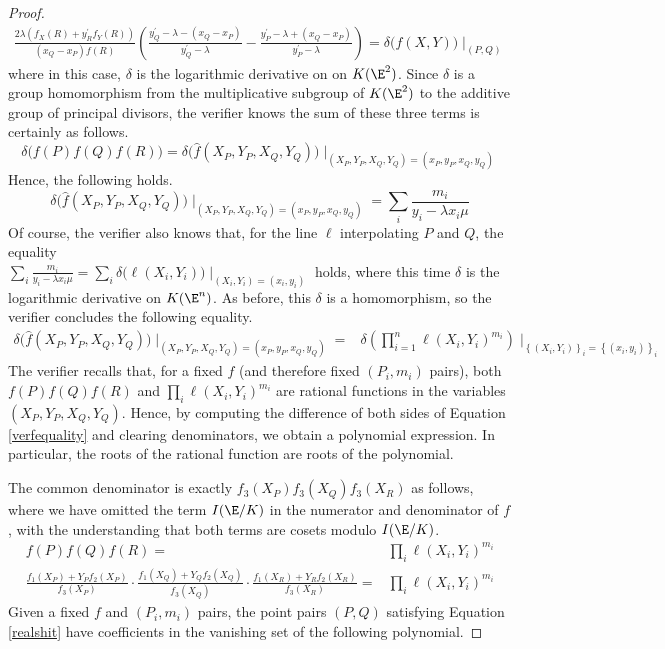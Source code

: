 \documentclass[11pt,letterpaper]{article}
\theoremstyle{definition}
\newcommand{\6}{\mathbf}
\newcommand{\7}{\mathcal}
\begin{document}
\begin{proof}
\begin{align}
\frac{2\lambda(f_X(R) + y^\prime_R f_Y(R))}{(x_Q-x_P) f(R)}\left(\frac{y_Q^\prime - \lambda - (x_Q-x_P)}{y_Q^\prime - \lambda} - \frac{y_P^\prime - \lambda + (x_Q-x_P)}{y_P^\prime - \lambda}\right) = \delta\big(f(X,Y)\big)\mid_{(P,Q)}
\end{align}
where in this case, $\delta$ is the logarithmic derivative on on $K(\E^2)$. Since $\delta$ is a group homomorphism from the multiplicative subgroup of $K(\E^2)$ to the additive group of principal divisors, the verifier knows the sum of these three terms is certainly as follows.
\[\delta\big(f(P)f(Q)f(R)\big) = \delta\big(\widehat{f}(X_P,Y_P,X_Q,Y_Q)\big)\mid_{(X_P,Y_P,X_Q,Y_Q)=(x_P,y_P,x_Q,y_Q)}\] Hence, the following holds.
$$\delta\big(\widehat{f}(X_P,Y_P,X_Q,Y_Q)\big)\mid_{(X_P,Y_P,X_Q,Y_Q)=(x_P,y_P,x_Q,y_Q)} = \sum_i \frac{m_i}{y_i-\lambda x_i \mu}$$
Of course, the verifier also knows that, for the line $\ell$ interpolating $P$ and $Q$, the equality \\
$\sum_i \frac{m_i}{y_i-\lambda x_i \mu} = \sum_i \delta\big(\ell(X_i,Y_i)\big)\mid_{(X_i,Y_i)=(x_i,y_i)}$ holds, where this time $\delta$ is the logarithmic derivative on $K(\E^n)$. As before, this $\delta$ is a homomorphism, so the verifier concludes the following equality.
\begin{align}
\delta\big(\widehat{f}(X_P,Y_P,X_Q,Y_Q)\big)\mid_{(X_P,Y_P,X_Q,Y_Q)=(x_P,y_P,x_Q,y_Q)} =& \delta\left(\prod_{i=1}^{n} \ell(X_i,Y_i)^{m_i}\right)\mid_{\left\{(X_i,Y_i)\right\}_i=\left\{(x_i,y_i)\right\}_i} \label{verfequality}
\end{align}
The verifier recalls that, for a fixed $f$ (and therefore fixed $(P_i, m_i)$ pairs), both $f(P)f(Q)f(R)$ and $\prod_i \ell(X_i,Y_i)^{m_i}$ are rational functions in the variables $(X_P, Y_P, X_Q, Y_Q)$. Hence, by computing the difference of both sides of Equation \ref{verfequality} and clearing denominators, we obtain a polynomial expression. In particular, the roots of the rational function are roots of the polynomial.

The common denominator is exactly $f_3(X_P)f_3(X_Q)f_3(X_R)$ as follows, where we have omitted the term $I(\E/K)$ in the numerator and denominator of $f$, with the understanding that both terms are cosets modulo $I(\E/K)$.
\begin{align}
f(P)f(Q)f(R) =& \prod_i \ell(X_i,Y_i)^{m_i} \\
\frac{f_1(X_P) + Y_P f_2(X_P)}{f_3(X_P)} \cdot \frac{f_1(X_Q) + Y_Q f_2(X_Q)}{f_3(X_Q)}  \cdot \frac{f_1(X_R) + Y_R f_2(X_R)}{f_3(X_R)} =& \prod_i \ell(X_i, Y_i)^{m_i}
\end{align}
Given a fixed $f$ and $(P_i,m_i)$ pairs, the point pairs $(P, Q)$ satisfying Equation \ref{realshit} have coefficients in the vanishing set of the following polynomial.


\end{proof}
\end{document}
